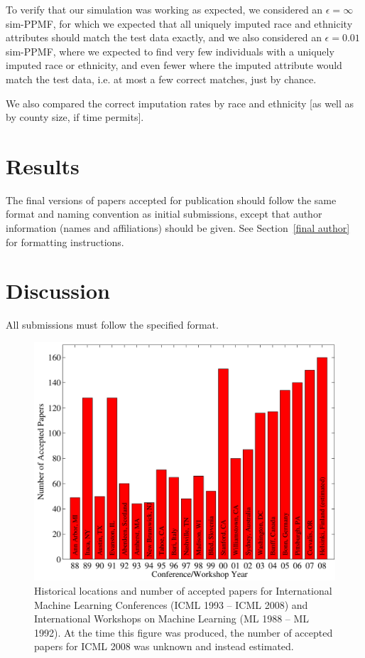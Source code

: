 \documentclass{article}
\begin{document}
To verify that our simulation was working as expected, we considered an $\epsilon=\infty$ sim-PPMF, for which we expected that all uniquely imputed race and ethnicity attributes should match the test data exactly, and we also considered an $\epsilon=0.01$ sim-PPMF, where we expected to find very few individuals with a uniquely imputed race or ethnicity, and even fewer where the imputed attribute would match the test data, i.e. at most a few correct matches, just by chance.

We also compared the correct imputation rates by race and ethnicity [as well as by county size, if time permits].


\section{Results}

The final versions of papers accepted for publication should follow the
same format and naming convention as initial submissions, except that
author information (names and affiliations) should be given. See
Section~\ref{final author} for formatting instructions.

\section{Discussion}

All submissions must follow the specified format.

\begin{figure}[ht]
\vskip 0.2in
\begin{center}
\centerline{\includegraphics[width=\columnwidth]{icml_numpapers}}
\caption{Historical locations and number of accepted papers for International
Machine Learning Conferences (ICML 1993 -- ICML 2008) and International
Workshops on Machine Learning (ML 1988 -- ML 1992). At the time this figure was
produced, the number of accepted papers for ICML 2008 was unknown and instead
estimated.}
\label{icml-historical}
\end{center}
\vskip -0.2in
\end{figure}
\end{document}
